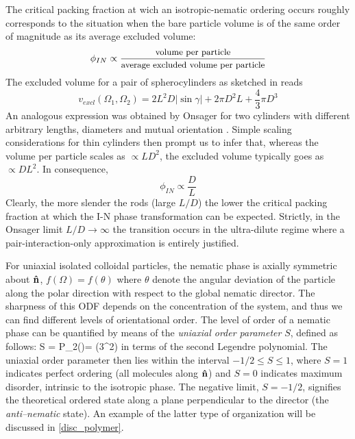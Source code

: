 The critical packing fraction at wich an isotropic-nematic ordering occurs roughly corresponds to the situation when the bare particle volume is of the same order of magnitude as its average excluded volume:
\begin{equation}
\phi_{IN} \propto \frac{\mbox{{\small volume per particle}}}{\mbox{{\small average excluded volume per particle}}}
\end{equation}
The excluded volume for a pair of spherocylinders as sketched in  reads
\begin{equation}
v_{excl}(\Omega_1,\Omega_2) = 2L^2D |\sin\gamma|+2\pi D^2 L + \frac{4}{3}\pi D^3
\end{equation}
An analogous expression was obtained by Onsager for two cylinders with different arbitrary lengths, diameters and mutual orientation \cite{onsager1949}. Simple scaling considerations for thin cylinders then prompt us to infer that, whereas the volume per particle scales as $\propto L D^2$, the excluded volume typically goes as $\propto D L^2$. In consequence,
\begin{equation}
\phi_{IN} \propto \frac{D}{L}
\end{equation}
Clearly, the more slender the rods (large $L/D$) the lower the critical packing fraction at which the I-N phase transformation can be expected. Strictly, in the Onsager limit $L/D \rightarrow \infty$ the transition occurs in the ultra-dilute regime where a pair-interaction-only approximation is entirely justified.

For uniaxial isolated colloidal particles, the nematic phase is axially symmetric about ${\bf \hat{n}}$, $f(\Omega)=f(\theta)$ where $\theta$ denote the angular deviation of the particle along the polar direction with respect to the global nematic director. The sharpness of this ODF depends on the concentration of the system, and thus we can find different levels of orientational order. The level of order of a nematic phase can be quantified by means of the {\em uniaxial order parameter} $S$, defined as follows:
\beq
S = \langle P_2(\cos\theta)\rangle =  (3\langle\cos^2\theta{})
\label{nemdirector}
\eeq
in terms of the second Legendre polynomial. The uniaxial order parameter then lies within the interval $-1/2 \leq S \leq 1$, where $S=1$ indicates perfect ordering (all molecules along ${\bf \hat{n}}$) and $S=0$ indicates maximum disorder, intrinsic to the isotropic phase. The negative limit, $S=-1/2$, signifies the theoretical ordered state along a plane perpendicular to the director (the {\em anti--nematic} state). An example of the latter type of organization will be discussed in \ref{disc_polymer}.


